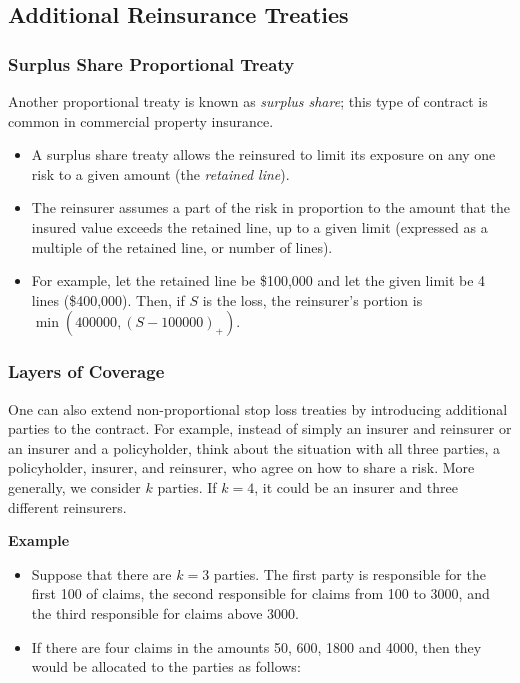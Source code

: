 \documentclass[]{book}
\theoremstyle{definition}
\theoremstyle{definition}
\theoremstyle{definition}
\theoremstyle{remark}
\begin{document}
\subsection{Additional Reinsurance
Treaties}\label{additional-reinsurance-treaties}

\subsubsection{Surplus Share Proportional
Treaty}\label{surplus-share-proportional-treaty}

Another proportional treaty is known as \emph{surplus share}; this type
of contract is common in commercial property insurance.

\begin{itemize}
\item
  A surplus share treaty allows the reinsured to limit its exposure on
  any one risk to a given amount (the \emph{retained line}).
\item
  The reinsurer assumes a part of the risk in proportion to the amount
  that the insured value exceeds the retained line, up to a given limit
  (expressed as a multiple of the retained line, or number of lines).
\item
  For example, let the retained line be \$100,000 and let the given
  limit be 4 lines (\$400,000). Then, if \(S\) is the loss, the
  reinsurer's portion is \(\min(400000, (S-100000)_+)\).
\end{itemize}

\subsubsection{Layers of Coverage}\label{layers-of-coverage}

One can also extend non-proportional stop loss treaties by introducing
additional parties to the contract. For example, instead of simply an
insurer and reinsurer or an insurer and a policyholder, think about the
situation with all three parties, a policyholder, insurer, and
reinsurer, who agree on how to share a risk. More generally, we consider
\(k\) parties. If \(k=4\), it could be an insurer and three different
reinsurers.

\textbf{Example}

\begin{itemize}
\item
  Suppose that there are \(k=3\) parties. The first party is responsible
  for the first 100 of claims, the second responsible for claims from
  100 to 3000, and the third responsible for claims above 3000.
\item
  If there are four claims in the amounts 50, 600, 1800 and 4000, then
  they would be allocated to the parties as follows:
\end{itemize}
\end{document}
